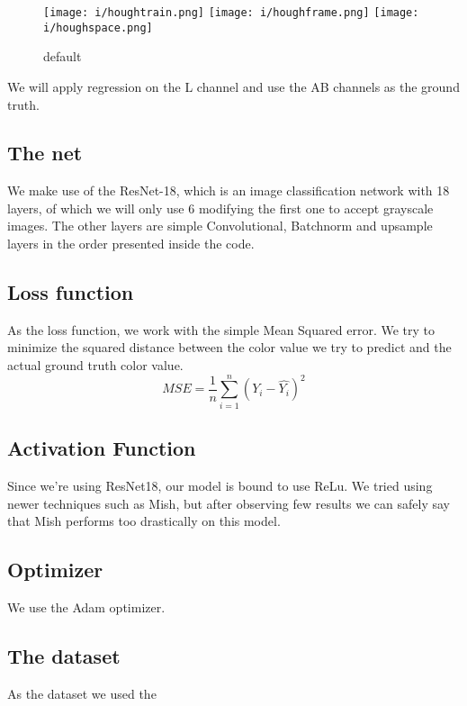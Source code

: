\documentclass{article}
\begin{document}
\begin{figure}[htp]

    \centering
    \texttt{[image: i/houghtrain.png]}\hfill
    \texttt{[image: i/houghframe.png]}\hfill
    \texttt{[image: i/houghspace.png]}
    
    \caption{default}
    \label{fig:figure 1. The LAB color space. L for including lightness and 
    AB for every other space}
    
    \end{figure}

We will apply regression on the L channel and use the AB channels as the 
ground truth. 

\subsection{The net}
We make use of the ResNet-18, which is an image classification network with 18
layers, of which we will only use 6 modifying the first one to accept grayscale
images. The other layers are simple Convolutional, Batchnorm and upsample 
layers in the order presented inside the code. 


\subsection{Loss function}
As the loss function, we work with the simple Mean Squared error. We try to 
minimize the squared distance between the color value we try to predict and the 
actual ground truth color value. 
$$ MSE = \frac{1}{n} \sum^{n}_{i=1}(Y_i - \hat{Y_i})^2$$ 

\subsection{Activation Function}
Since we're using ResNet18, our model is bound to use ReLu. We tried using 
newer techniques such as Mish, but after observing few results we can safely 
say that Mish performs too drastically on this model. 

\subsection{Optimizer}
We use the Adam optimizer. 

\subsection{The dataset}
As the dataset we used the 
\end{document}
